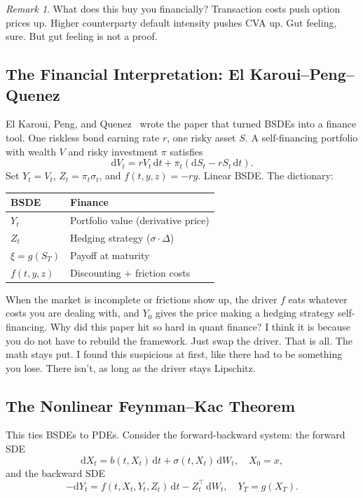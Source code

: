 \documentclass[11pt]{article}
\theoremstyle{definition}
\theoremstyle{remark}
\newtheorem{remark}[theorem]{Remark}
\newcommand{\dt}{\,\mathrm{d}t}
\newcommand{\dW}{\,\mathrm{d}W}
\begin{document}
\begin{remark}
What does this buy you financially? Transaction costs push option
prices up. Higher counterparty default intensity pushes CVA up.
Gut feeling, sure. But gut feeling is not a proof.
\end{remark}

\subsection{The Financial Interpretation: El Karoui--Peng--Quenez}

El Karoui, Peng, and Quenez~\cite{elkaroui1997backward} wrote the
paper that turned BSDEs into a finance tool.
One riskless bond earning rate $r$, one risky asset $S$.
A self-financing portfolio with wealth $V$ and risky investment $\pi$
satisfies
\[
  \mathrm{d}V_t = r V_t \dt + \pi_t (\mathrm{d}S_t - r S_t \dt).
\]
Set $Y_t = V_t$, $Z_t = \pi_t \sigma_t$, and $f(t,y,z) = -ry$.
Linear BSDE. The dictionary:
\begin{center}
\begin{tabular}{ll}
\toprule
\textbf{BSDE} & \textbf{Finance} \\
\midrule
$Y_t$ & Portfolio value (derivative price) \\
$Z_t$ & Hedging strategy ($\sigma \cdot \Delta$) \\
$\xi = g(S_T)$ & Payoff at maturity \\
$f(t, y, z)$ & Discounting + friction costs \\
\bottomrule
\end{tabular}
\end{center}

When the market is incomplete or frictions show up, the driver $f$ eats
whatever costs you are dealing with, and $Y_0$ gives the price
making a hedging strategy self-financing.
Why did this paper hit so hard in quant finance? I think it is because
you do not have to rebuild the framework. Just swap the driver. That is
all. The math stays put. I found this suspicious at first, like there
had to be something you lose. There isn't, as long as the driver stays
Lipschitz.

\subsection{The Nonlinear Feynman--Kac Theorem}\label{sec:nlfk}

This ties BSDEs to PDEs. Consider the forward-backward system: the
forward SDE
\begin{equation}\label{eq:fbsde_forward}
  \mathrm{d}X_t = b(t, X_t)\dt + \sigma(t, X_t)\dW_t, \quad X_0 = x,
\end{equation}
and the backward SDE
\begin{equation}\label{eq:fbsde_backward}
  -\mathrm{d}Y_t = f(t, X_t, Y_t, Z_t)\dt - Z_t^\top \dW_t,
  \quad Y_T = g(X_T).
\end{equation}
\end{document}
